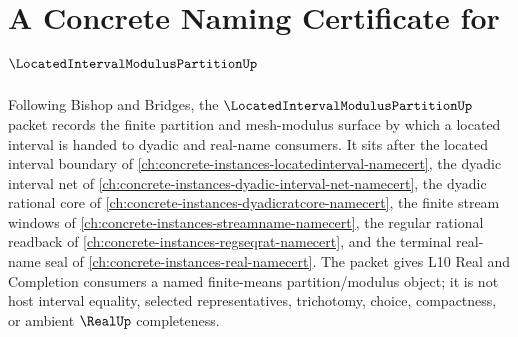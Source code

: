 \chapter{A Concrete Naming Certificate for $\LocatedIntervalModulusPartitionUp$}
\label{ch:concrete-instances-located-interval-modulus-partition-namecert}

Following Bishop and Bridges, the $\LocatedIntervalModulusPartitionUp$ packet records the finite partition and mesh-modulus surface by which a located interval is handed to dyadic and real-name consumers. It sits after the located interval boundary of \autoref{ch:concrete-instances-locatedinterval-namecert}, the dyadic interval net of \autoref{ch:concrete-instances-dyadic-interval-net-namecert}, the dyadic rational core of \autoref{ch:concrete-instances-dyadicratcore-namecert}, the finite stream windows of \autoref{ch:concrete-instances-streamname-namecert}, the regular rational readback of \autoref{ch:concrete-instances-regseqrat-namecert}, and the terminal real-name seal of \autoref{ch:concrete-instances-real-namecert}. The packet gives L10 Real and Completion consumers a named finite-means partition/modulus object; it is not host interval equality, selected representatives, trichotomy, choice, compactness, or ambient $\RealUp$ completeness.

